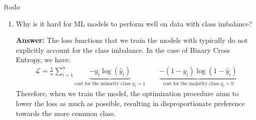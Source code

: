 ƒtodo\documentclass{article}
\newenvironment{QandA}{\begin{enumerate}[label=\arabic*.]}{\end{enumerate}}
\newenvironment{InnerQandA}{\begin{enumerate}[label=\roman*.]}{\end{enumerate}}
\newenvironment{answer}{\par\normalfont \textbf{Answer:}}{}
\begin{document}
\begin{QandA}
\begin{InnerQandA}
\begin{answer}
            (Source: \href{https://en.wikipedia.org/wiki/Accuracy_paradox}{Wikipedia})
        \end{answer}

        \item Why is it hard for ML models to perform well on data with class imbalance?
        \begin{answer}
            The loss functions that we train the models with typically do not explicitly account for the class imbalance. In the case of Binary Cross Entropy, we have:
            \begin{align*}
                \mathcal{L} = \frac{1}{n} \sum_{i=1}^n \underbrace{-y_i \log (\hat{y}_i)}_{\text{cost for the minority class } y_i = 1} \quad \quad \underbrace{-(1 - y_i)\log(1 - \hat{y}_i)}_{\text{cost for the majority class } y_i = 0}
            \end{align*}
            Therefore, when we train the model, the optimization procedure aims to lower the loss as much as possible, resulting in disproportionate preference towards the more common class.
        \end{answer}


\end{InnerQandA}
\end{QandA}
\end{document}
